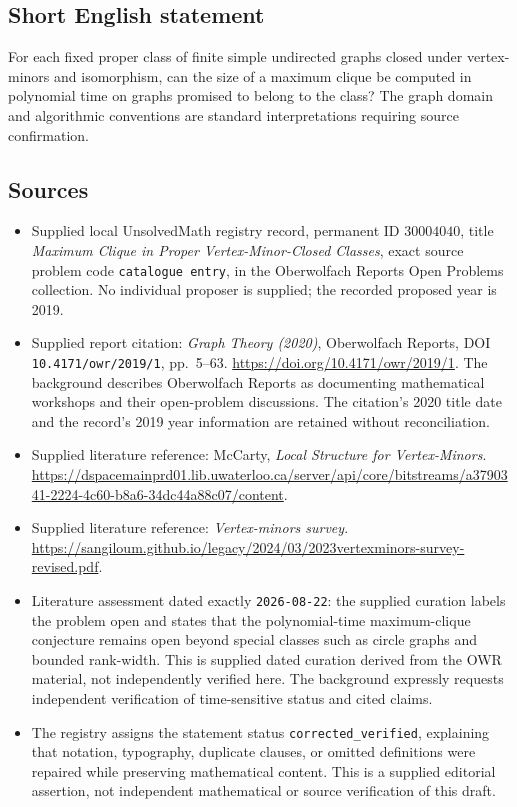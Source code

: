 \documentclass[11pt]{article}
\begin{document}
\subsection{Short English statement}
For each fixed proper class of finite simple undirected graphs closed under vertex-minors and isomorphism, can the size of a maximum clique be computed in polynomial time on graphs promised to belong to the class? The graph domain and algorithmic conventions are standard interpretations requiring source confirmation.
\subsection{Sources}
\begin{itemize}
\item Supplied local UnsolvedMath registry record, permanent ID \(30004040\), title \emph{Maximum Clique in Proper Vertex-Minor-Closed Classes}, exact source problem code \texttt{catalogue entry}, in the Oberwolfach Reports Open Problems collection. No individual proposer is supplied; the recorded proposed year is 2019.
\item Supplied report citation: \emph{Graph Theory (2020)}, Oberwolfach Reports, DOI \texttt{10.4171/owr/2019/1}, pp.\ 5--63. \url{https://doi.org/10.4171/owr/2019/1}. The background describes Oberwolfach Reports as documenting mathematical workshops and their open-problem discussions. The citation's 2020 title date and the record's 2019 year information are retained without reconciliation.
\item Supplied literature reference: McCarty, \emph{Local Structure for Vertex-Minors}. \url{https://dspacemainprd01.lib.uwaterloo.ca/server/api/core/bitstreams/a3790341-2224-4c60-b8a6-34dc44a88c07/content}.
\item Supplied literature reference: \emph{Vertex-minors survey}. \url{https://sangiloum.github.io/legacy/2024/03/2023vertexminors-survey-revised.pdf}.
\item Literature assessment dated exactly \texttt{2026-08-22}: the supplied curation labels the problem open and states that the polynomial-time maximum-clique conjecture remains open beyond special classes such as circle graphs and bounded rank-width. This is supplied dated curation derived from the OWR material, not independently verified here. The background expressly requests independent verification of time-sensitive status and cited claims.
\item The registry assigns the statement status \texttt{corrected\_verified}, explaining that notation, typography, duplicate clauses, or omitted definitions were repaired while preserving mathematical content. This is a supplied editorial assertion, not independent mathematical or source verification of this draft.
\end{itemize}
\end{document}
